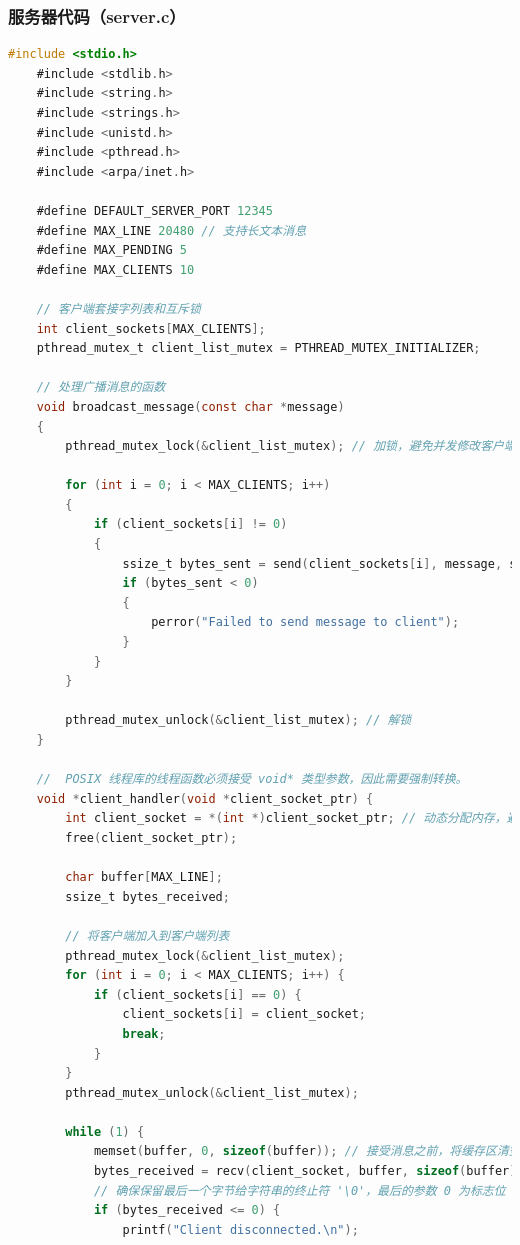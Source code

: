 \documentclass[14pt,a4paper,UTF8,twoside]{article}
\begin{document}
\subsubsection{服务器代码（server.c）}

\begin{lstlisting}[language=C]
    #include <stdio.h>
    #include <stdlib.h>
    #include <string.h>
    #include <strings.h>
    #include <unistd.h>
    #include <pthread.h>
    #include <arpa/inet.h>
    
    #define DEFAULT_SERVER_PORT 12345
    #define MAX_LINE 20480 // 支持长文本消息
    #define MAX_PENDING 5
    #define MAX_CLIENTS 10
    
    // 客户端套接字列表和互斥锁
    int client_sockets[MAX_CLIENTS];
    pthread_mutex_t client_list_mutex = PTHREAD_MUTEX_INITIALIZER;
    
    // 处理广播消息的函数
    void broadcast_message(const char *message)
    {
        pthread_mutex_lock(&client_list_mutex); // 加锁，避免并发修改客户端列表
    
        for (int i = 0; i < MAX_CLIENTS; i++)
        {
            if (client_sockets[i] != 0)
            {
                ssize_t bytes_sent = send(client_sockets[i], message, strlen(message), 0);
                if (bytes_sent < 0)
                {
                    perror("Failed to send message to client");
                }
            }
        }
    
        pthread_mutex_unlock(&client_list_mutex); // 解锁
    }
    
    //  POSIX 线程库的线程函数必须接受 void* 类型参数，因此需要强制转换。
    void *client_handler(void *client_socket_ptr) {
        int client_socket = *(int *)client_socket_ptr; // 动态分配内存，避免 client_socket 被覆盖
        free(client_socket_ptr);
    
        char buffer[MAX_LINE];
        ssize_t bytes_received;
    
        // 将客户端加入到客户端列表
        pthread_mutex_lock(&client_list_mutex);
        for (int i = 0; i < MAX_CLIENTS; i++) {
            if (client_sockets[i] == 0) {
                client_sockets[i] = client_socket;
                break;
            }
        }
        pthread_mutex_unlock(&client_list_mutex);
    
        while (1) {
            memset(buffer, 0, sizeof(buffer)); // 接受消息之前，将缓存区清空，防止信息混乱
            bytes_received = recv(client_socket, buffer, sizeof(buffer) - 1, 0);
            // 确保保留最后一个字节给字符串的终止符 '\0'，最后的参数 0 为标志位
            if (bytes_received <= 0) {
                printf("Client disconnected.\n");
    

\end{lstlisting}
\end{document}
